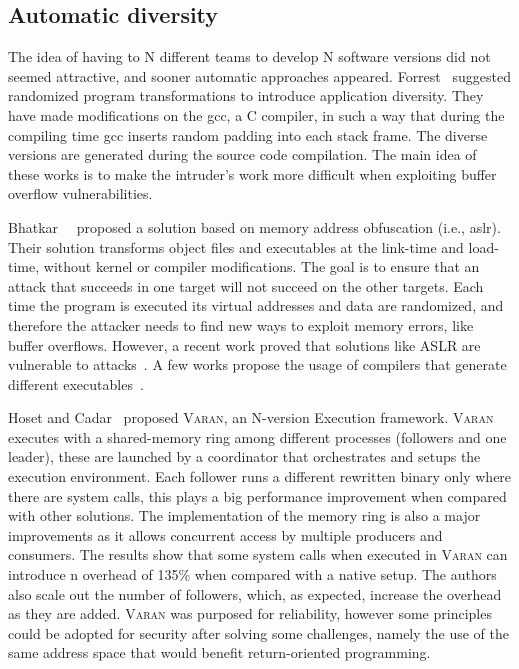 \subsection{Automatic diversity}  
The idea of having to N different teams to develop N software versions did not seemed attractive, and sooner automatic approaches appeared.
Forrest~\cite{Forrest:1997} suggested randomized program transformations to introduce application diversity. 
They have made modifications on the gcc, a C compiler, in such a way that during the compiling time gcc inserts random padding
into each stack frame. 
The diverse versions are generated during the source code compilation. 
The main idea of these works is to make the intruder’s work more difficult when exploiting buffer overflow vulnerabilities.

Bhatkar~\etal{}~\cite{Bhatkar:2003} proposed a solution based on memory address obfuscation (i.e., \gls{aslr}). 
Their solution transforms object files and executables at the link-time and load-time, without kernel or compiler modifications. 
The goal is to ensure that an attack that succeeds in one target will not succeed on the other targets. 
Each time the program is executed its virtual addresses and data are randomized, and therefore the attacker needs to find new ways to exploit memory errors, like buffer overflows. 
However, a recent work proved that solutions like ASLR are vulnerable to attacks~\cite{Bittau:2014,Jang:2016}.
A few works propose the usage of compilers that generate different executables~\cite{Platania:2014,Roeder:2010,King:2016}.

Hoset and Cadar~\cite{Hosek:2015} proposed \textsc{Varan}, an N-version Execution framework.
\textsc{Varan} executes with a shared-memory ring among different processes (followers and one leader), these are launched by a coordinator that orchestrates and setups the execution environment.
Each follower runs a different rewritten binary only where there are system calls, this plays a big performance improvement when compared with other solutions.
The implementation of the memory ring is also a major improvements as it allows concurrent access by multiple producers and consumers.
The results show that some system calls when executed in \textsc{Varan} can introduce n overhead of 135\% when compared with a native setup.
The authors also scale out the number of followers, which, as expected, increase the overhead as they are added. 
\textsc{Varan} was purposed for reliability, however some principles could be adopted for security after solving some challenges, namely the use of the same address space that would benefit return-oriented programming.

